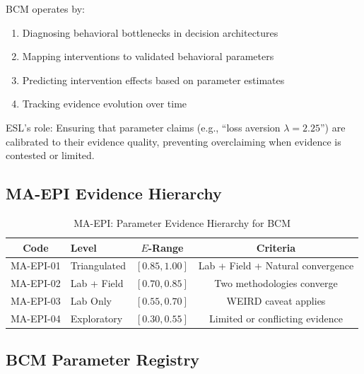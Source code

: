 \documentclass[11pt,a4paper]{article}
\begin{document}
BCM operates by:
\begin{enumerate}
    \item Diagnosing behavioral bottlenecks in decision architectures
    \item Mapping interventions to validated behavioral parameters
    \item Predicting intervention effects based on parameter estimates
    \item Tracking evidence evolution over time
\end{enumerate}

ESL's role: Ensuring that parameter claims (e.g., ``loss aversion $\lambda = 2.25$'') are calibrated to their evidence quality, preventing overclaiming when evidence is contested or limited.

\subsection{MA-EPI Evidence Hierarchy}

\begin{table}[h]
\centering
\caption{MA-EPI: Parameter Evidence Hierarchy for BCM}
\label{tab:MA-EPI}
\begin{tabular}{clcc}
\toprule
\textbf{Code} & \textbf{Level} & \textbf{$E$-Range} & \textbf{Criteria} \\
\midrule
MA-EPI-01 & Triangulated & $[0.85, 1.00]$ & Lab + Field + Natural convergence \\
MA-EPI-02 & Lab + Field & $[0.70, 0.85]$ & Two methodologies converge \\
MA-EPI-03 & Lab Only & $[0.55, 0.70]$ & WEIRD caveat applies \\
MA-EPI-04 & Exploratory & $[0.30, 0.55]$ & Limited or conflicting evidence \\
\bottomrule
\end{tabular}
\end{table}

\subsection{BCM Parameter Registry}
\end{document}
